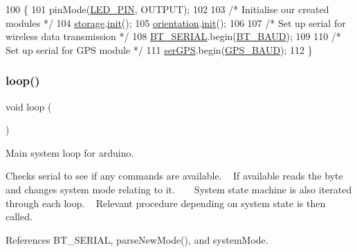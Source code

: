 \begin{DoxyCode}
100 \{
101   pinMode(\hyperlink{logging-device_8ino_ab4553be4db9860d940f81d7447173b2f}{LED\_PIN}, OUTPUT);
102 
103   \textcolor{comment}{/* Initialise our created modules */}
104   \hyperlink{logging-device_8ino_a40059244119c00baa1b841119cfd1b2e}{storage}.\hyperlink{class_logging_device_1_1_storage_a98b01eb20a64a4bf4127685147f7f6f1}{init}();
105   \hyperlink{logging-device_8ino_a47be0262307aa023a1bda3d98986a16d}{orientation}.\hyperlink{class_logging_device_1_1_orientation_a317461c5c8afa8c3abf56847d4544728}{init}();
106 
107   \textcolor{comment}{/* Set up serial for wireless data transmission */}
108   \hyperlink{logging-device_8ino_ad1e6e6f6fc813b305067b9e1b0777ea6}{BT\_SERIAL}.begin(\hyperlink{logging-device_8ino_a6882992121626898bccaa43be51ba4c2}{BT\_BAUD});
109 
110   \textcolor{comment}{/* Set up serial for GPS module */}
111   \hyperlink{logging-device_8ino_aa2475f51bdc0f31d16d2916991d618d9}{serGPS}.begin(\hyperlink{logging-device_8ino_af0875ffe69dbe45df3f85c1f720c3eee}{GPS\_BAUD});
112 \}
\end{DoxyCode}
\mbox{\label{logging-device_8ino_afe461d27b9c48d5921c00d521181f12f}} 
\subsubsection{\texorpdfstring{loop()}{loop()}}
{\footnotesize\ttfamily void loop (\begin{DoxyParamCaption}{ }\end{DoxyParamCaption})}



Main system loop for arduino. 

Checks serial to see if any commands are available. ~\newline
If available reads the byte and changes system mode relating to it. ~\newline
~\newline
System state machine is also iterated through each loop. ~\newline
Relevant procedure depending on system state is then called. 

References B\+T\+\_\+\+S\+E\+R\+I\+AL, parse\+New\+Mode(), and system\+Mode.


